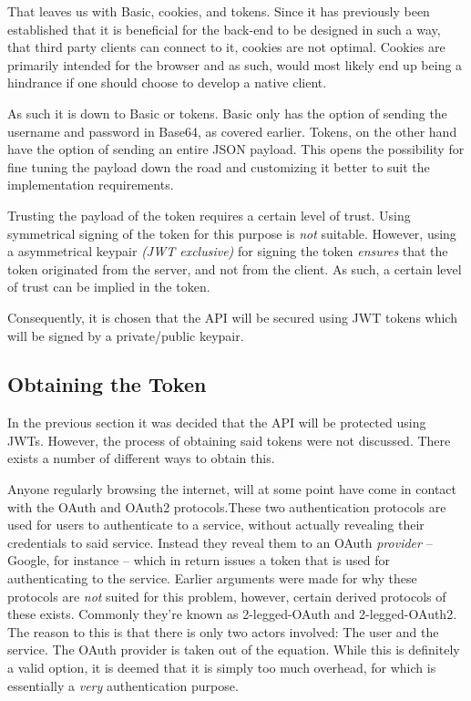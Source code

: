 				That leaves us with Basic, cookies, and tokens. Since it has previously been established that it is beneficial for the back-end to be designed in such a way, that third party clients can connect to it, cookies are not optimal. Cookies are primarily intended for the browser and as such, would most likely end up being a hindrance if one should choose to develop a native client.

				As such it is down to Basic or tokens. Basic only has the option of sending the username and password in Base64, as covered earlier. Tokens, on the other hand have the option of sending an entire JSON payload. This opens the possibility for fine tuning the payload down the road and customizing it better to suit the implementation requirements. 

				Trusting the payload of the token requires a certain level of trust. Using symmetrical signing of the token for this purpose is \emph{not} suitable. However, using a asymmetrical keypair \emph{(JWT exclusive)} for signing the token \emph{ensures} that the token originated from the server, and not from the client. As such, a certain level of trust can be implied in the token.

				Consequently, it is chosen that the API will be secured using JWT tokens which will be signed by a private/public keypair.

		\subsection{Obtaining the Token}
			In the previous section it was decided that the API will be protected using JWTs. However, the process of obtaining said tokens were not discussed. There exists a number of different ways to obtain this.

			Anyone regularly browsing the internet, will at some point have come in contact with the OAuth and OAuth2 protocols.These two authentication protocols are used for users to authenticate to a service, without actually revealing their credentials to said service. Instead they reveal them to an OAuth \emph{provider} -- Google, for instance -- which in return issues a token that is used for authenticating to the service. Earlier arguments were made for why these protocols are \emph{not} suited for this problem, however, certain derived protocols of these exists. Commonly they're known as 2-legged-OAuth and 2-legged-OAuth2. The reason to this is that there is only two actors involved: The user and the service. The OAuth provider is taken out of the equation. While this is definitely a valid option, it is deemed that it is simply too much overhead, for which is essentially a \emph{very} authentication purpose.

